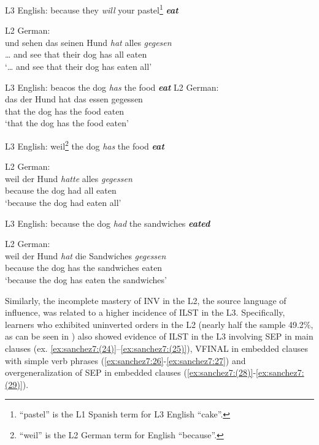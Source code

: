 \documentclass[output=paper,modfonts,nonflat, newtxmath]{langsci/langscibook}
\begin{document}
\ea%
  \label{ex:sanchez7:20}
  \begin{xlist}
  \ex L3 English: because they \textit{will} your pastel\footnote{“pastel” is the L1 Spanish term for L3 English “cake”.} \textbf{\textit{eat}}

  \ex L2 German:\\
  \gll {\dots} und sehen das seinen Hund \textit{hat} alles  \textit{gegesen}\\
     {\dots} and see   that their dog   has  all  eaten \\
  \glt ‘{\dots} and see that their dog has eaten all’
  \end{xlist}
\ex %
  \label{ex:sanchez7:21}
  \begin{xlist}
  	\ex L3 English: beacos the dog \textit{has} the food \textbf{\textit{eat}}
  	\ex L2 German:\\
  	\gll das  der Hund  {hat}  das essen  {gegessen}\\
  		that  the dog   has  the food  eaten \\
  	\glt ‘that the dog has the food eaten’
  \end{xlist}
\ex %
  \label{ex:sanchez7:22}
  \begin{xlist}
  	\ex L3 English:  weil\footnote{“weil” is the L2 German term for English “because”.} the dog \textit{has} the food \textbf{\textit{eat}}

  	\ex L2 German:\\
  	\gll weil der Hund \textit{hatte} alles  \textit{gegessen}\\
  		because  the dog   had   all   eaten\\
  	\glt ‘because the dog had eaten all’
  \end{xlist}
\ex %
  \label{ex:sanchez7:23}
  \begin{xlist}
  	\ex L3 English: because the dog \textit{had} the sandwiches \textbf{\textit{eated}}

  	\ex L2 German:\\
  	\gll weil     der Hund  \textit{hat}  die Sandwiches  \textit{gegessen}\\
   because  the dog   has  the sandwiches  eaten\\
  	\glt ‘because the dog has eaten the sandwiches’
  \end{xlist}
  \z

Similarly, the incomplete mastery of INV in the L2, the source language of influence, was related to a higher incidence of ILST in the L3. Specifically, learners who exhibited uninverted orders in the L2 (nearly half the sample 49.2\%, as can be seen in ) also showed evidence of ILST in the L3 involving SEP in main clauses (ex. \ref{ex:sanchez7:(24)}--\ref{ex:sanchez7:(25)}), VFINAL in embedded clauses with simple verb phrases (\ref{ex:sanchez7:26}-\ref{ex:sanchez7:27}) and overgeneralization of SEP in embedded clauses (\ref{ex:sanchez7:(28)}-\ref{ex:sanchez7:(29)}).
\end{document}
